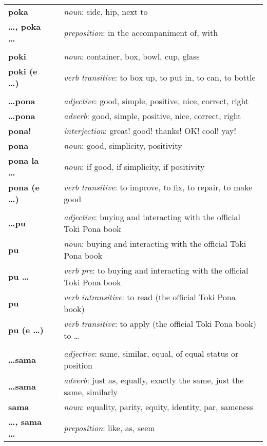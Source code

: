 \begin{supertabular}{p{2,5cm}|ll}
\textbf{poka} && \textit{noun}: side, hip, next to \\ 
\textbf{\dots , poka \dots} && \textit{preposition}: in the accompaniment of, with \\ 
 && \\ %
\textbf{poki} && \textit{noun}: container, box, bowl, cup, glass \\ 
\textbf{poki (e \dots)} && \textit{verb transitive}: to box up, to put in, to can, to bottle \\ 
 && \\ %
\textbf{\dots pona} && \textit{adjective}: good, simple, positive, nice, correct, right \\ 
\textbf{\dots pona} && \textit{adverb}: good, simple, positive, nice, correct, right \\ 
\textbf{pona!} && \textit{interjection}: great! good! thanks! OK! cool! yay! \\ 
\textbf{pona} && \textit{noun}: good, simplicity, positivity \\ 
\textbf{pona la \dots} && \textit{noun}: if good, if simplicity, if positivity \\ 
\textbf{pona (e \dots)} && \textit{verb transitive}: to improve, to fix, to repair, to make good \\ 
 && \\ %
\textbf{\dots pu} && \textit{adjective}: buying and interacting with the official Toki Pona book \\ 
\textbf{pu} && \textit{noun}: buying and interacting with the official Toki Pona book \\ 
\textbf{pu \dots} && \textit{verb pre}: to buying and interacting with the official Toki Pona book \\ 
\textbf{pu} && \textit{verb intransitive}:  to read (the official Toki Pona book) \\
\textbf{pu (e \dots)} && \textit{verb transitive}: to apply (the official Toki Pona book) to \dots \\
 && \\ %
\textbf{\dots sama} && \textit{adjective}: same, similar, equal, of equal status or position \\ 
\textbf{\dots sama} && \textit{adverb}: just as, equally, exactly the same, just the same, similarly \\ 
\textbf{sama} && \textit{noun}: equality, parity, equity, identity, par, sameness \\ 
\textbf{\dots , sama \dots} && \textit{preposition}: like, as, seem \\ 

\end{supertabular}
